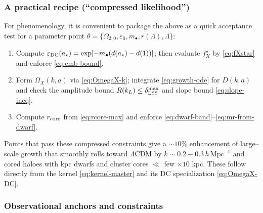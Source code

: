 \documentclass[10pt]{article}
\theoremstyle{definition}
\theoremstyle{plain}
\begin{document}
\subsubsection*{A practical recipe (``compressed likelihood'')}\label{subsubsec:uom-main-021}
For phenomenology, it is convenient to package the above as a quick acceptance test for a parameter point $\theta=\{\Omega_{2,0},\varepsilon_0,m_\bullet,r(\Lambda),\Lambda\}$:

\begin{enumerate}[itemsep=2pt]
\item Compute $\varepsilon_{\rm DC}(a_\star)=\exp[-m_\bullet(d(a_\star)-d(1))]$; then evaluate $f_X^\star$ by \eqref{eq:fXstar} and enforce \eqref{eq:cmb-bound}.
\item Form $\Omega_X(k,a)$ via \eqref{eq:OmegaX-k}; integrate \eqref{eq:growth-ode} for $D(k,a)$ and check the amplitude bound $R(k_L)\le \delta_{\rm LSS}^{\max}$ and slope bound \eqref{eq:slope-ineq}.
\item Compute $r_{\rm core}$ from \eqref{eq:rcore-max} and enforce \eqref{eq:dwarf-band}–\eqref{eq:mr-from-dwarf}.
\end{enumerate}
Points that pass these compressed constraints give a $\sim 10\%$ enhancement of large–scale growth that
smoothly rolls toward $\Lambda$CDM by $k\sim 0.2{-}0.3\,h\,\mathrm{Mpc}^{-1}$ and cored haloes with kpc dwarfs and
cluster cores $\ll$ few $\times 10$ kpc. These follow directly from the kernel \eqref{eq:kernel-master} and its DC specialization \eqref{eq:OmegaX-DC}.

\subsubsection*{Observational anchors and constraints}\label{subsubsec:uom-main-022}
\end{document}
